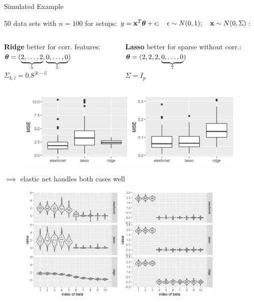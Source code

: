 \documentclass[11pt,compress,t,notes=noshow, xcolor=table]{beamer}
\begin{document}
\begin{vbframe} {Simulated Example}

\footnotesize
50 data sets with $n=100$ for setups: $y =\mathbf{x}^T \bm{\theta} + \epsilon; \quad \epsilon \sim N(0,1);
  \quad \mathbf{x} \sim N(0, \Sigma)$: 
\vspace{-0.3cm}
\begin{columns}
\begin{column}{0.5\textwidth}
\begin{center}
{\footnotesize \textbf{Ridge} better for corr. features}: \\ 
$\bm{\theta}=(\underbrace{2,\ldots,2}_{5},\underbrace{0,\ldots,0}_{5})$\\
$ \Sigma_{k,l}=0.8^{|k-l|}$ 
  \end{center}
\end{column}
\begin{column}{0.5\textwidth} 
\begin{center}
{\footnotesize \textbf{Lasso} better for sparse without corr.:} \\
$\bm{\theta}=(2, 2, 2,\underbrace{0,\ldots,0}_{7})$ \\
$ \Sigma = I_p$ 
\end{center}
\end{column}
\end{columns}

\begin{figure}
\includegraphics[width=\textwidth]{figure/enet_lasso_ridge_mse.png}\\
\end{figure}
{\normalsize $\implies$ elastic net handles both cases well}
\framebreak

\begin{figure}
\includegraphics[width=0.9\textwidth]{figure/enet_tradeoff.png}\\
\end{figure}



\end{vbframe}
\end{document}
